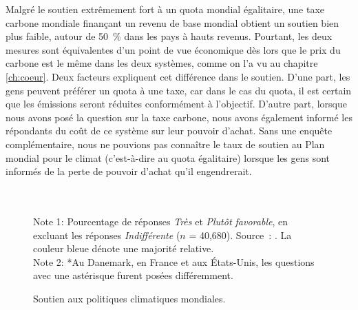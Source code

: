 \documentclass[a5paper,french]{memoir}
\begin{document}
Malgré le soutien extrêmement fort à un quota mondial égalitaire, une taxe carbone mondiale finançant un revenu de base mondial obtient un soutien bien plus faible, autour de 50~\% dans les pays à hauts revenus. Pourtant, les deux mesures sont équivalentes d'un point de vue économique dès lors que le prix du carbone est le même dans les deux systèmes, comme on l'a vu au chapitre \ref{ch:coeur}. Deux facteurs expliquent cet différence dans le soutien. D'une part, les gens peuvent préférer un quota à une taxe, car dans le cas du quota, il est certain que les émissions seront réduites conformément à l'objectif. D'autre part, lorsque nous avons posé la question sur la taxe carbone, nous avons également informé les répondants du coût de ce système sur leur pouvoir d'achat. Sans une enquête complémentaire, nous ne pouvions pas connaître le taux de soutien au Plan mondial pour le climat (c'est-à-dire au quota égalitaire) lorsque les gens sont informés de la perte de pouvoir d'achat qu'il engendrerait. 

\begin{figure}[h!]
  \caption[Soutien aux politiques climatiques mondiales]{Soutien aux politiques climatiques mondiales.} 
  \label{fig:oecd} %
  {\footnotesize \\ $\quad$ \\ Note 1: Pourcentage de réponses \textit{Très} et \textit{Plutôt favorable}, en excluant les réponses \textit{Indifférent\textperiodcentered{}e} ($n$ = 40,680). Source~: \citet{fabre_global_2023}. %
  La couleur bleue dénote une majorité relative. %
  \\ Note 2: *Au Danemark, en France et aux États-Unis, les questions avec une astérisque furent posées différemment. %
  } 
\end{figure}
\end{document}
